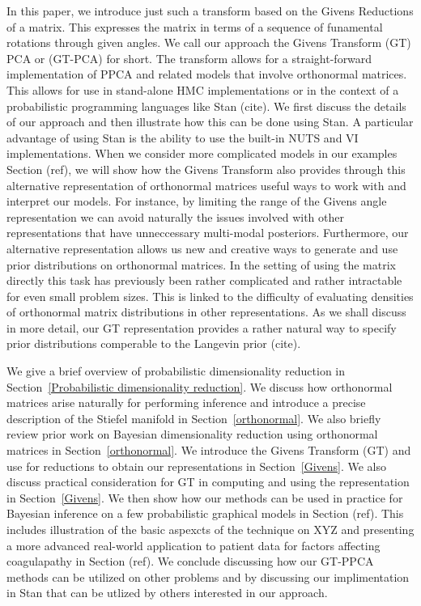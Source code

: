 \documentclass{article}
\begin{document}
In this paper, we introduce just such a transform based on the Givens Reductions of a matrix.  This expresses the matrix in terms of a sequence of funamental rotations through given angles.  We call our approach the Givens Transform (GT) PCA or (GT-PCA) for short.  The transform allows for a straight-forward implementation of PPCA and related models that involve orthonormal matrices.  This allows for use in stand-alone HMC implementations or in the context of a probabilistic programming languages like Stan (cite). We first discuss the details of our approach and then illustrate how this can be done using Stan.  A particular advantage of using Stan is the ability to use the built-in NUTS and VI implementations.  When we consider more complicated models in our examples Section (ref), we will show how the Givens Transform also provides through this alternative representation of orthonormal matrices useful ways to work with and interpret our models.  For instance, by limiting the range of the Givens angle representation we can avoid naturally the issues involved with other representations that have unneccessary multi-modal posteriors.  Furthermore, our alternative representation allows us new and creative ways to generate and use prior distributions on orthonormal matrices.  In the setting of using the matrix directly this task has previously been rather complicated and rather intractable for even small problem sizes.  This is linked to the difficulty of evaluating densities of orthonormal matrix distributions in other representations.  As we shall discuss in more detail, our GT representation provides a rather natural way to specify prior distributions comperable to the Langevin prior (cite).

We give a brief overview of probabilistic dimensionality reduction in Section~\ref{Probabilistic dimensionality reduction}.  We discuss how orthonormal matrices arise naturally for performing inference and introduce a precise description of the Stiefel manifold in Section~\ref{orthonormal}.  We also briefly review prior work on 
Bayesian dimensionality reduction using orthonormal matrices in Section~\ref{orthonormal}.  We introduce the Givens Transform (GT) and use for reductions to obtain our representations in Section~\ref{Givens}.  We also discuss practical consideration for GT in computing and using the representation in Section~\ref{Givens}.  We then show how our methods can be used in practice for Bayesian inference on a few probabilistic graphical models in Section (ref).  This includes illustration of the basic aspexcts of the technique on XYZ and presenting a more advanced real-world application to patient data for factors affecting coagulapathy in Section (ref).  We conclude discussing how our GT-PPCA methods can be utilized on other problems and by discussing our implimentation in Stan that can be utlized by others interested in our approach.
\end{document}

